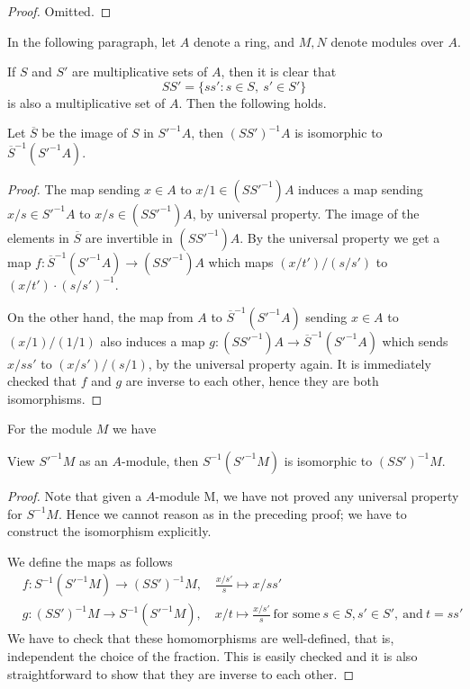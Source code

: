 \begin{proof}
Omitted.
\end{proof}

\noindent
In the following paragraph,
let $A$ denote a ring,
and $M,N$ denote modules over $A$.

\medskip\noindent
If $S$ and $S'$ are multiplicative sets of $A$, then it is
clear that
\[
SS'=\{ss':s\in S,\ s'\in S'\}
\]
is also a multiplicative set of $A$. Then the following holds.

\begin{proposition}
Let $\overline{S}$ be the image of $S$ in $S'^{-1}A$, then
$(SS')^{-1}A$ is isomorphic to $\overline{S}^{-1}(S'^{-1}A)$.
\end{proposition}

\begin{proof}
The map sending $x\in A$ to $x/1\in (SS'^{-1})A$ induces a map
sending $x/s\in S'^{-1}A$ to $x/s \in (SS'^{-1})A$, by universal
property. The image of the elements in $\overline{S}$ are invertible
in $(SS'^{-1})A$. By the universal property we get a map
$f:\overline{S}^{-1}(S'^{-1}A)\rightarrow (SS'^{-1})A$ which maps
$(x/t')/(s/s')$ to $(x/t')\cdot(s/s')^{-1}$.

\medskip\noindent
On the other hand, the map from $A$ to $\overline{S}^{-1}(S'^{-1}A)$
sending $x\in A$ to $(x/1)/(1/1)$ also induces a map
$g:(SS'^{-1})A\rightarrow \overline{S}^{-1}(S'^{-1}A)$ which sends $x/ss'$
to $(x/s')/(s/1)$, by the universal property again. It is
immediately checked that $f$ and $g$ are inverse to each other,
hence they are both isomorphisms.
\end{proof}

\noindent
For the module $M$ we have

\begin{proposition}
View $S'^{-1}M$ as an $A$-module, then $S^{-1}(S'^{-1}M)$ is
isomorphic to $(SS')^{-1}M$.
\end{proposition}

\begin{proof}
Note that given a $A$-module M, we have not proved any
universal property for $S^{-1}M$. Hence we cannot reason
as in the preceding proof; we have to construct the isomorphism explicitly.

\medskip\noindent
We define the maps as follows
\begin{align*}
&f:S^{-1}(S'^{-1}M) \longrightarrow (SS')^{-1}M, \quad \frac{x/s'}{s}\mapsto
x/ss'\\
&g:(SS')^{-1}M \longrightarrow S^{-1}(S'^{-1}M), \quad x/t\mapsto
\frac{x/s'}{s}\ \text{for some}\ s\in S, s'\in S',\ \text{and}\
t=ss'
\end{align*}
We have to check that these homomorphisms are well-defined, that is, 
independent the choice of the fraction. This is easily checked and it is also 
straightforward to show that they are inverse to each other.
\end{proof}


